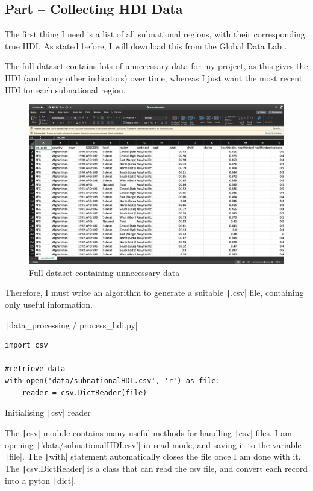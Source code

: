 \documentclass[12pt]{report}
\newcommand{\pil}[1]{\protect\texttt|#1|}
\begin{document}
\subsection{Part \theparts{} -- Collecting HDI Data}\label{sec:collectHDI}\label{sec:hdiTrainingData}
The first thing I need is a list of all subnational regions, with their corresponding true HDI. As stated before, I will download this from the Global Data Lab \cite{hdiData}.

The full dataset contains lots of unnecessary data for my project, as this gives the HDI (and many other indicators) over time, whereas I just want the most recent HDI for each subnational region.

\begin{figure}[H]
\centering
\includegraphics[width=12cm]{ss1.1.png}
\caption{Full dataset containing unnecessary data}
\end{figure}

Therefore, I must write an algorithm to generate a suitable \pil{.csv} file, containing only useful information.

\begin{listing}[H]
\pil{data_processing / process_hdi.py}
\begin{verbatim}
import csv

#retrieve data
with open('data/subnationalHDI.csv', 'r') as file:
    reader = csv.DictReader(file)
\end{verbatim}
\caption{Initialising \pil{csv} reader}\label{cs:csvReader}
\end{listing}
The \pil{csv} module contains many useful methods for handling \pil{csv} files. I am opening \pil{'data/subnationalHDI.csv'} in read mode, and saving it to the variable \pil{file}. The \pil{with} statement automatically closes the file once I am done with it. The \pil{csv.DictReader} is a class that can read the csv file, and convert each record into a pyton \pil{dict}.
\end{document}
